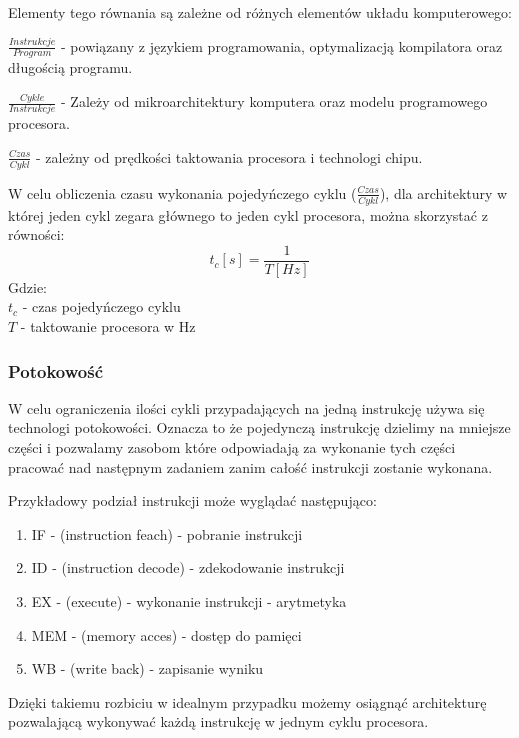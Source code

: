 Elementy tego równania są zależne od różnych elementów układu komputerowego:
\begin{description}
        \item $\frac{Instrukcje}{Program}$ - powiązany z językiem programowania, optymalizacją kompilatora oraz długością programu. 
        \item $\frac{Cykle}{Instrukcje}$ - Zależy od mikroarchitektury komputera oraz modelu programowego procesora.
        \item $\frac{Czas}{Cykl}$ -  zależny od prędkości taktowania procesora i technologi chipu. 
\end{description} 


W celu obliczenia czasu wykonania pojedyńczego cyklu ($\frac{Czas}{Cykl}$), dla architektury w której jeden cykl zegara głównego to jeden cykl procesora, można skorzystać z równości:
\begin{equation}
        \label{Cykli w sec}
        t_c [s]= \frac{1}{T [Hz]}
\end{equation} 
Gdzie:\\
\indent $t_c$ - czas pojedyńczego cyklu \\
\indent $T$ - taktowanie procesora w Hz

\subsubsection{Potokowość}

W celu ograniczenia ilości cykli przypadających na jedną instrukcję używa się technologi potokowości. 
Oznacza to że pojedynczą instrukcję dzielimy na mniejsze części i pozwalamy zasobom które odpowiadają za wykonanie tych części pracować nad następnym zadaniem zanim całość instrukcji zostanie wykonana.

Przykładowy podział instrukcji może wyglądać następująco:
\begin{enumerate}
        \item IF - (instruction feach) - pobranie instrukcji
        \item ID - (instruction decode) -  zdekodowanie instrukcji
        \item EX - (execute) - wykonanie instrukcji - arytmetyka
        \item MEM - (memory acces) - dostęp do pamięci
        \item WB - (write back) - zapisanie wyniku
\end{enumerate}

Dzięki takiemu rozbiciu w idealnym przypadku możemy osiągnąć architekturę pozwalającą wykonywać każdą instrukcję w jednym cyklu procesora. 

